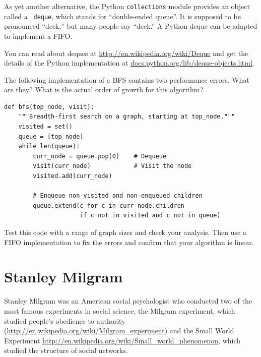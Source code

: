 \documentclass[10pt]{book}
\begin{document}
As yet another alternative,
the Python {\tt collections} module provides an object called a {\tt
  deque}, which stands for ``double-ended queue''.  It is supposed to
be pronounced ``deck,'' but many people say ``deek.''  A Python deque
can be adapted to implement a FIFO.

You can read about deques at \url{http://en.wikipedia.org/wiki/Deque}
and get the details of the Python implementation at
\url{docs.python.org/lib/deque-objects.html}.


\begin{exercise}

The following implementation of a BFS
contains two performance errors.  What are
they?  What is the actual order of growth for this algorithm?

\begin{verbatim}
def bfs(top_node, visit):
    """Breadth-first search on a graph, starting at top_node."""
    visited = set()
    queue = [top_node]
    while len(queue):
        curr_node = queue.pop(0)    # Dequeue
        visit(curr_node)            # Visit the node
        visited.add(curr_node)

        # Enqueue non-visited and non-enqueued children
        queue.extend(c for c in curr_node.children
                     if c not in visited and c not in queue)
\end{verbatim}

Test this code with a range of graph sizes and check your analysis.
Then use a FIFO implementation to fix the errors and confirm
that your algorithm is linear.

\end{exercise}


\section{Stanley Milgram}

Stanley Milgram was an American social psychologist who conducted
two of the most famous experiments in social science, the
Milgram experiment, which studied people's obedience to authority
(\url{http://en.wikipedia.org/wiki/Milgram_experiment})
and the Small World Experiment
\url{http://en.wikipedia.org/wiki/Small_world_phenomenon}, which studied
the structure of social networks.
\end{document}

